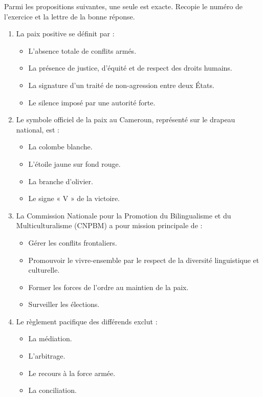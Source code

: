 \documentclass[11pt]{article}
\begin{document}
\begin{exercice}
Parmi les propositions suivantes, une seule est exacte. Recopie le numéro de l'exercice et la lettre de la bonne réponse.
\begin{enumerate}
\item La paix positive se définit par :
\begin{itemize}
\item[A.] L'absence totale de conflits armés.
\item[B.] La présence de justice, d'équité et de respect des droits humains.
\item[C.] La signature d'un traité de non-agression entre deux États.
\item[D.] Le silence imposé par une autorité forte.
\end{itemize}
\item Le symbole officiel de la paix au Cameroun, représenté sur le drapeau national, est :
\begin{itemize}
\item[A.] La colombe blanche.
\item[B.] L'étoile jaune sur fond rouge.
\item[C.] La branche d'olivier.
\item[D.] Le signe « V » de la victoire.
\end{itemize}
\item La Commission Nationale pour la Promotion du Bilingualisme et du Multiculturalisme (CNPBM) a pour mission principale de :
\begin{itemize}
\item[A.] Gérer les conflits frontaliers.
\item[B.] Promouvoir le vivre-ensemble par le respect de la diversité linguistique et culturelle.
\item[C.] Former les forces de l'ordre au maintien de la paix.
\item[D.] Surveiller les élections.
\end{itemize}
\item Le règlement pacifique des différends exclut :
\begin{itemize}
\item[A.] La médiation.
\item[B.] L'arbitrage.
\item[C.] Le recours à la force armée.
\item[D.] La conciliation.
\end{itemize}
\end{enumerate}
\end{exercice}
\end{document}
